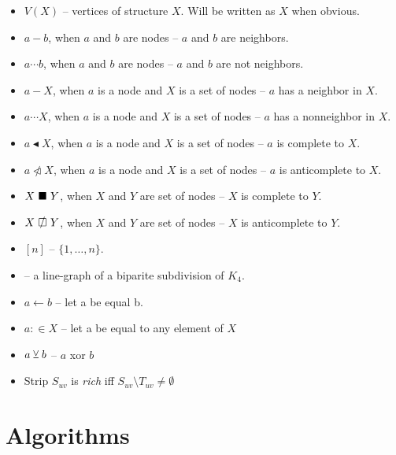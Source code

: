 \documentclass{report}
\begin{document}
\begin{itemize}
	\item $V(X)$ -- vertices of structure $X$. Will be written as $X$ when obvious.
	\item $a - b$, when $a$ and $b$ are nodes -- $a$ and $b$ are neighbors.
	\item $a \cdots b$, when $a$ and $b$ are nodes -- $a$ and $b$ are not neighbors.
	\item $a - X$, when $a$ is a node and $X$ is a set of nodes -- $a$ has a neighbor in $X$.
	\item $a \cdots X$, when $a$ is a node and $X$ is a set of nodes -- $a$ has a nonneighbor in $X$.
	\item $a \blacktriangleleft  X$, when $a$ is a node and $X$ is a set of nodes -- $a$ is complete to $X$.
	\item $a \ntriangleleft X$, when $a$ is a node and $X$ is a set of nodes -- $a$ is anticomplete to $X$.
	\item $X \ \blacksquare\  Y$, when $X$ and $Y$ are set of nodes -- $X$ is complete to $Y$.
	\item $X \setAntiComplete Y$, when $X$ and $Y$ are set of nodes -- $X$ is anticomplete to $Y$.
	\item $[n]$  -- $\{1, \ldots, n\}$.
	\item \LGBSK -- a line-graph of a biparite subdivision of $K_4$.
	\item $a \gets b$ -- let a be equal b.
	\item $a :\in X$ -- let a be equal to any element of $X$
	\item $a \veebar b$ -- $a$ xor $b$

	\item Strip $S_{uv}$ is \emph{rich} iff $S_{uv} \setminus T_{uv} \neq \emptyset$
\end{itemize}

\section{Algorithms}


\clearpage


\clearpage

% 

% 
\end{document}
